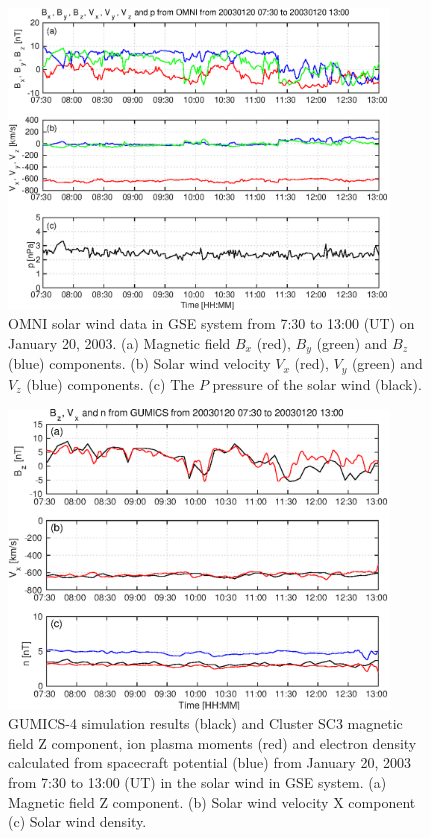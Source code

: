 \documentclass[linenumbers,draft]{agujournal}
\begin{document}
\begin{figure}[h]
\centering
\includegraphics[width=0.9\textwidth,angle=0]{swe-2021-corr-f02}  
\caption{OMNI solar wind data in GSE system from 7:30 to 13:00 (UT) on January 20, 2003. (a) Magnetic field $B_{x}$ (red), $B_{y}$ (green) and $B_{z}$ (blue) components. (b) Solar wind velocity $V_{x}$ (red), $V_{y}$ (green) and $V_{z}$ (blue) components. (c) The $P$ pressure of the solar wind (black).}

\label{fig:swomni}
\end{figure}

\pagebreak

\begin{figure}[h]
\centering
\includegraphics[width=0.9\textwidth,angle=0]{swe-2021-corr-f03}  
\caption{GUMICS-4 simulation results (black) and Cluster SC3 magnetic field Z component, ion plasma moments (red) and electron density calculated from spacecraft potential (blue) from January 20, 2003 from 7:30 to 13:00 (UT) in the solar wind in GSE system. (a) Magnetic field Z component. (b) Solar wind velocity X component (c) Solar wind density.}
\label{fig:swplot}
\end{figure}
\end{document}
